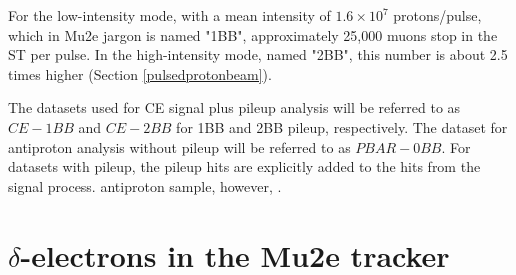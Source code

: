 For the low-intensity mode, with a mean intensity of 
$1.6 \times 10^7$ protons/pulse, which in Mu2e 
jargon is named "1BB", approximately 25,000 
muons stop in the ST per pulse. In the high-intensity 
mode, named "2BB", this number is about 2.5 times higher (Section \ref{pulsedprotonbeam}).

The datasets used for CE signal plus pileup 
analysis will be referred to as $CE-1BB$ and $CE-2BB$ 
for 1BB and 2BB pileup, respectively. The dataset for 
antiproton analysis without pileup will be 
referred to as $PBAR-0BB$.
For datasets with pileup, 
the pileup hits are explicitly added to the hits from 
the signal process.  antiproton sample, however, 
. 
\section{$\delta$-electrons in the Mu2e tracker}\label{trackerdeltas}

